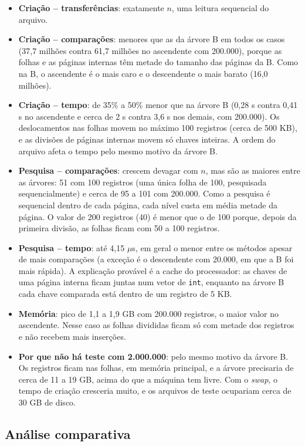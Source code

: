 \documentclass{article}
\begin{document}
\begin{itemize}
    \item \textbf{Criação -- transferências}: exatamente $n$, uma leitura sequencial do arquivo.
    \item \textbf{Criação -- comparações}: menores que as da árvore B em todos os casos (37,7 milhões contra 61,7 milhões no ascendente com 200.000), porque as folhas e as páginas internas têm metade do tamanho das páginas da B. Como na B, o ascendente é o mais caro e o descendente o mais barato (16,0 milhões).
    \item \textbf{Criação -- tempo}: de 35\% a 50\% menor que na árvore B (0,28 s contra 0,41 s no ascendente e cerca de 2 s contra 3,6 s nos demais, com 200.000). Os deslocamentos nas folhas movem no máximo 100 registros (cerca de 500 KB), e as divisões de páginas internas movem só chaves inteiras. A ordem do arquivo afeta o tempo pelo mesmo motivo da árvore B.
    \item \textbf{Pesquisa -- comparações}: crescem devagar com $n$, mas são as maiores entre as árvores: 51 com 100 registros (uma única folha de 100, pesquisada sequencialmente) e cerca de 95 a 101 com 200.000. Como a pesquisa é sequencial dentro de cada página, cada nível custa em média metade da página. O valor de 200 registros (40) é menor que o de 100 porque, depois da primeira divisão, as folhas ficam com 50 a 100 registros.
    \item \textbf{Pesquisa -- tempo}: até 4,15 $\mu$s, em geral o menor entre os métodos apesar de mais comparações (a exceção é o descendente com 20.000, em que a B foi mais rápida). A explicação provável é a cache do processador: as chaves de uma página interna ficam juntas num vetor de \texttt{int}, enquanto na árvore B cada chave comparada está dentro de um registro de 5 KB.
    \item \textbf{Memória}: pico de 1,1 a 1,9 GB com 200.000 registros, o maior valor no ascendente. Nesse caso as folhas divididas ficam só com metade dos registros e não recebem mais inserções.
    \item \textbf{Por que não há teste com 2.000.000}: pelo mesmo motivo da árvore B. Os registros ficam nas folhas, em memória principal, e a árvore precisaria de cerca de 11 a 19 GB, acima do que a máquina tem livre. Com o \emph{swap}, o tempo de criação cresceria muito, e os arquivos de teste ocupariam cerca de 30 GB de disco.
\end{itemize}

\subsection{Análise comparativa}
\end{document}
